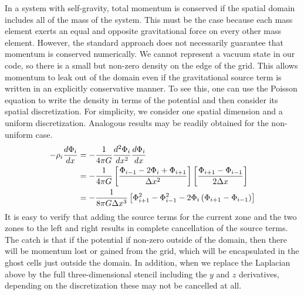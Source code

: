 \documentclass[12pt]{article}
\begin{document}
In a system with self-gravity, total momentum is conserved if the spatial domain
includes all of the mass of the system. This must be the 
case because each mass element exerts an equal and opposite gravitational force 
on every other mass element. However, the standard approach does not necessarily
guarantee that momentum is conserved numerically. We cannot represent a vacuum state 
in our code, so there is a small but non-zero density on the edge of the grid. 
This allows momentum to leak out of the domain even if the gravitational source term 
is written in an explicitly conservative manner. To see this, one can use the Poisson equation to write the 
density in terms of the potential and then consider its spatial discretization. For simplicity,
we consider one spatial dimension and a uniform discretization. Analogous results 
may be readily obtained for the non-uniform case.
\begin{align}
  -\rho_{i}  \frac{d\Phi_{i}}{dx} &= -\frac{1}{4\pi G} \frac{d^2\Phi_i}{dx^2} \frac{d \Phi_i}{dx} \notag \\
  &= -\frac{1}{4\pi G} \left[\frac{\Phi_{i-1} - 2 \Phi_{i} + \Phi_{i+1}}{\Delta x^2}\right] \left[ \frac{\Phi_{i+1} - \Phi_{i-1}}{2\Delta x} \right] \notag \\
  &= -\frac{1}{8\pi G \Delta x^3} \left[ \Phi_{i+1}^2 - \Phi_{i-1}^2 - 2\Phi_i\left(\Phi_{i+1} - \Phi_{i-1}\right) \right] \label{eq:momentum_discretization}
\end{align}
It is easy to verify that adding the source terms for the current zone and the two zones 
to the left and right results in complete cancellation of the source terms.
The catch is that if the potential if non-zero outside of the domain, then there will be
momentum lost or gained from the grid, which will be encapsulated in the ghost cells
just outside the domain. In addition, when we replace the Laplacian above by the full
three-dimensional stencil including the $y$ and $z$ derivatives, depending on the
discretization these may not be cancelled at all.
\end{document}
